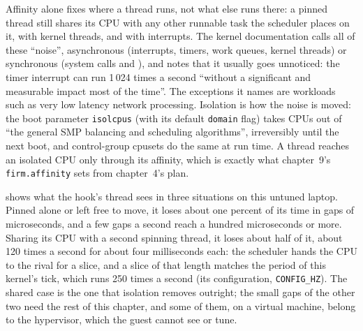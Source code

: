 Affinity alone fixes where a thread runs, not what else runs there: a pinned thread still shares its CPU with any other
runnable task the scheduler places on it, with kernel threads, and with interrupts. The kernel documentation calls all of
these ``noise'', asynchronous (interrupts, timers, work queues, kernel threads) or synchronous (system calls and ), and notes that it usually goes unnoticed: the timer interrupt can run 1\,024 times a second ``without a significant
and measurable impact most of the time''. The exceptions it names are workloads such as very low latency network processing.
Isolation is how the noise is moved: the boot parameter \texttt{isolcpus} (with its default \texttt{domain} flag) takes CPUs
out of ``the general SMP balancing and scheduling algorithms'', irreversibly until the next boot, and control-group cpusets
do the same at run time. A thread reaches an isolated CPU only through its affinity, which is exactly what chapter~9's
\texttt{firm.affinity} sets from chapter~4's plan.

 shows what the hook's thread sees in three situations on this untuned laptop. Pinned
alone or left free to move, it loses about one percent of its time in gaps of microseconds, and a few gaps a second reach
a hundred microseconds or more. Sharing its CPU with a second spinning thread, it loses about half of it, about 120 times a
second for about four milliseconds each: the scheduler hands the CPU to the rival for a slice, and a slice of that length
matches the period of this kernel's tick, which runs 250 times a second (its configuration, \texttt{CONFIG\_HZ}). The shared case is the one that
isolation removes outright; the small gaps of the other two need the rest of this chapter, and some of them, on a virtual
machine, belong to the hypervisor, which the guest cannot see or tune.

